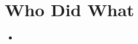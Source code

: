 \documentclass[./Report_main.tex]{subfiles}
\begin{document}
\section{Who Did What}
\begin{itemize}
    \item 
\end{itemize}
\end{document}
